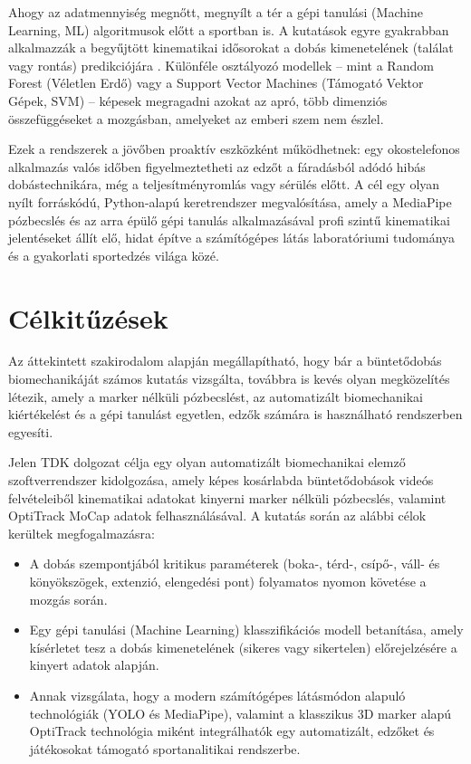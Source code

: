 Ahogy az adatmennyiség megnőtt, megnyílt a tér a gépi tanulási (Machine Learning, ML) algoritmusok előtt a sportban is. A kutatások egyre gyakrabban alkalmazzák a begyűjtött kinematikai idősorokat a dobás kimenetelének (találat vagy rontás) predikciójára \cite{Chen2021}. Különféle osztályozó modellek – mint a Random Forest (Véletlen Erdő) vagy a Support Vector Machines (Támogató Vektor Gépek, SVM) – képesek megragadni azokat az apró, több dimenziós összefüggéseket a mozgásban, amelyeket az emberi szem nem észlel.

Ezek a rendszerek a jövőben proaktív eszközként működhetnek: egy okostelefonos alkalmazás valós időben figyelmeztetheti az edzőt a fáradásból adódó hibás dobástechnikára, még a teljesítményromlás vagy sérülés előtt. A cél egy olyan nyílt forráskódú, Python-alapú keretrendszer megvalósítása, amely a MediaPipe pózbecslés és az arra épülő gépi tanulás alkalmazásával profi szintű kinematikai jelentéseket állít elő, hidat építve a számítógépes látás laboratóriumi tudománya és a gyakorlati sportedzés világa közé.

\section{Célkitűzések}
Az áttekintett szakirodalom alapján megállapítható, hogy bár a büntetődobás biomechanikáját számos kutatás vizsgálta, továbbra is kevés olyan megközelítés létezik, amely a marker nélküli pózbecslést, az automatizált biomechanikai kiértékelést és a gépi tanulást egyetlen, edzők számára is használható rendszerben egyesíti.

Jelen TDK dolgozat célja egy olyan automatizált biomechanikai elemző szoftverrendszer kidolgozása, amely képes kosárlabda büntetődobások videós felvételeiből kinematikai adatokat kinyerni marker nélküli pózbecslés, valamint OptiTrack MoCap adatok felhasználásával.
A kutatás során az alábbi célok kerültek megfogalmazásra:
\begin{itemize}
    \item A dobás szempontjából kritikus paraméterek (boka-, térd-, csípő-, váll- és könyökszögek, extenzió, elengedési pont) folyamatos nyomon követése a mozgás során.
    \item Egy gépi tanulási (Machine Learning) klasszifikációs modell betanítása, amely kísérletet tesz a dobás kimenetelének (sikeres vagy sikertelen) előrejelzésére a kinyert adatok alapján.
    \item Annak vizsgálata, hogy a modern számítógépes látásmódon alapuló technológiák (YOLO és MediaPipe), valamint a klasszikus 3D marker alapú OptiTrack technológia miként integrálhatók egy automatizált, edzőket és játékosokat támogató sportanalitikai rendszerbe.
\end{itemize}

